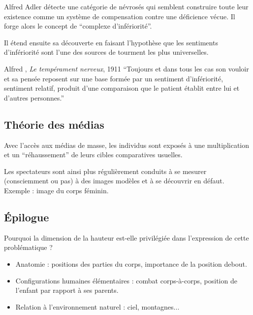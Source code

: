 	Alfred Adler détecte une catégorie de névrosés qui semblent construire toute leur existence comme un système de compensation contre une déficience vécue.
	Il forge alors le concept de “complexe d'infériorité”.

	Il étend ensuite sa découverte en faisant l'hypothèse que les sentiments d'infériorité sont l'une des sources de tourment les plus universelles.
	
	\begin{aquote}{Alfred , \textit{Le tempérament nerveux}, 1911}
	“Toujours et dans tous les cas son vouloir et sa pensée reposent sur une base formée par un sentiment d'infériorité, sentiment relatif, produit d'une comparaison que le patient établit entre lui et d'autres personnes.”
	\end{aquote}

\subsection{Théorie des médias}

	Avec l'accès aux médias de masse, les individus sont exposés à une multiplication et un “réhaussement” de leurs cibles comparatives usuelles.

	Les spectateurs sont ainsi plus régulièrement conduits à se mesurer (consciemment ou pas) à des images modèles et à se découvrir en défaut.
	Exemple : image du corps féminin.

\subsection{Épilogue}

	Pourquoi la dimension de la hauteur est-elle privilégiée dans l'expression de cette problématique ?

	\begin{itemize}
	\item Anatomie : positions des parties du corps, importance de la position debout.
	\item Configurations humaines élémentaires : combat corps-à-corps, position de l'enfant par rapport à ses parents.
	\item Relation à l'environnement naturel : ciel, montagnes...
	\end{itemize}
